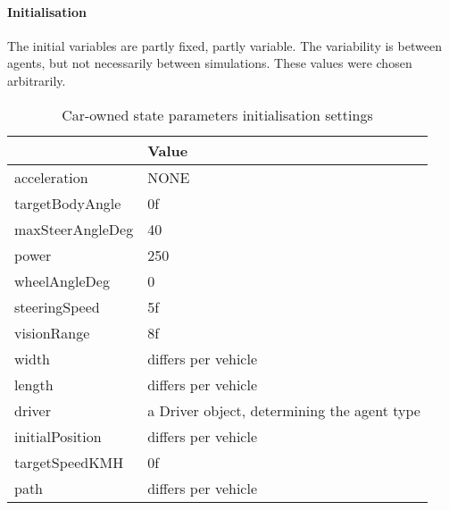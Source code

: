 \paragraph{Initialisation}
\label{par:method:model:details:initialization}

The initial variables are partly fixed, partly variable. The variability is between agents, but not necessarily between simulations. These values were chosen arbitrarily.


\begin{table}[H]
	\centering
	\begin{tabular}{|l | p{10.5cm} |}
		\hline
		\normalfont{Parameter}	& Value \\ \hline \hline
		acceleration 			& NONE \\ \hline
		targetBodyAngle 		& 0f \\ \hline
		maxSteerAngleDeg 		& 40 \\ \hline
		power 					& 250 \\ \hline
		wheelAngleDeg 			& 0 \\ \hline
		steeringSpeed 			& 5f \\ \hline
		visionRange 			& 8f \\ \hline
		width 					& differs per vehicle \\ \hline
		length 					& differs per vehicle \\ \hline
		driver 					& a Driver object, determining the agent type \\ \hline
		initialPosition 		& differs per vehicle \\ \hline
		targetSpeedKMH			& 0f \\ \hline
		path					& differs per vehicle \\ \hline
	\end{tabular}
	\caption{Car-owned state parameters initialisation settings}
	\label{tab:par:method:model:details:init:car:value}
\end{table} 

